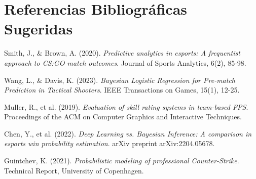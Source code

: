 \documentclass[12pt,a4paper]{article}
\begin{document}
\section{Referencias Bibliográficas Sugeridas}

\begin{enumerate}[label={[\arabic*]}]
    \item Smith, J., \& Brown, A. (2020). \textit{Predictive analytics in esports: A frequentist approach to CS:GO match outcomes}. Journal of Sports Analytics, 6(2), 85-98.
    \item Wang, L., \& Davis, K. (2023). \textit{Bayesian Logistic Regression for Pre-match Prediction in Tactical Shooters}. IEEE Transactions on Games, 15(1), 12-25.
    \item Muller, R., et al. (2019). \textit{Evaluation of skill rating systems in team-based FPS}. Proceedings of the ACM on Computer Graphics and Interactive Techniques.
    \item Chen, Y., et al. (2022). \textit{Deep Learning vs. Bayesian Inference: A comparison in esports win probability estimation}. arXiv preprint arXiv:2204.05678.
    \item Guintchev, K. (2021). \textit{Probabilistic modeling of professional Counter-Strike}. Technical Report, University of Copenhagen.
\end{enumerate}
\end{document}

